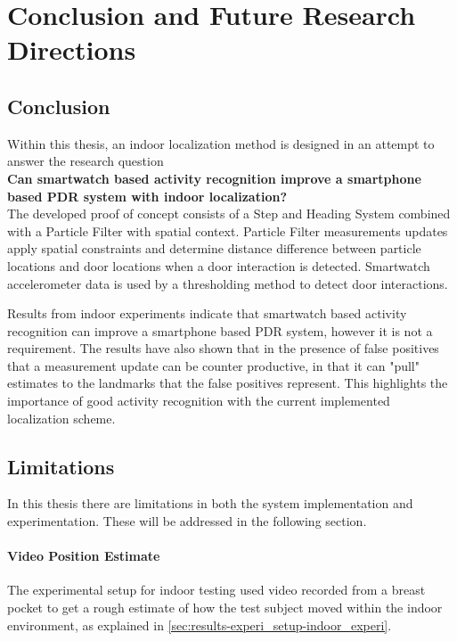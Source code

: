 \chapter{Conclusion and Future Research Directions}

\section{Conclusion}

Within this thesis, an indoor localization method is designed in an attempt to answer the research question \\

\textbf{Can smartwatch based activity recognition improve a smartphone based \ac{PDR} system with indoor localization?} \\

The developed proof of concept consists of a Step and Heading System combined with a Particle Filter with spatial context. Particle Filter measurements updates apply spatial constraints and determine distance difference between particle locations and door locations when a door interaction is detected. Smartwatch accelerometer data is used by a thresholding method to detect door interactions. \par

Results from indoor experiments indicate that smartwatch based activity recognition can improve a smartphone based \ac{PDR} system, however it is not a requirement. The results have also shown that in the presence of false positives that a measurement update can be counter productive, in that it can "pull" estimates to the landmarks that the false positives represent. This highlights the importance of good activity recognition with the current implemented localization scheme.

\section{Limitations}
In this thesis there are limitations in both the system implementation and  experimentation. These will be addressed in the following section.

\subsubsection{Video Position Estimate}
The experimental setup for indoor testing used video recorded from a breast pocket to get a rough estimate of how the test subject moved within the indoor environment, as explained in \cref{sec:results-experi_setup-indoor_experi}. \par 

